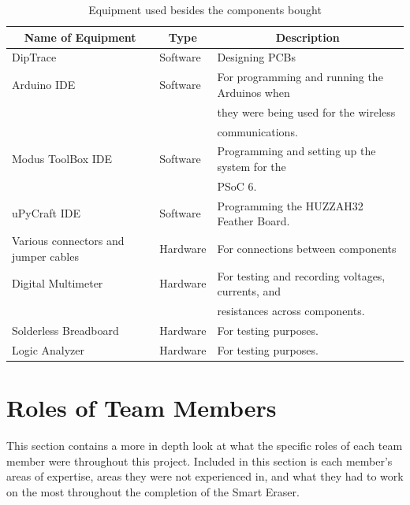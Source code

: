 \begin{table} [H]
	\normalsize
	\centering
	\begin{tabular}{|l|l|l|}
		\hline
		\multicolumn{1}{|c|}{\textbf{Name of Equipment}}  & 
		\multicolumn{1}{|c|}{\textbf{Type}}  & 
		\multicolumn{1}{|c|}{\textbf{Description}} \\
		\hline
				DipTrace 	&  Software		& Designing PCBs \\
		\hline
				Arduino IDE 	&  Software		& For programming and running the Arduinos when \\
								&  				& they were being used for the wireless \\
								&  				& communications. \\
		\hline
				Modus ToolBox IDE 	&  Software		& Programming and setting up the system for the \\
									&  				& PSoC 6. \\
		\hline
				uPyCraft IDE 	&  Software		& Programming the HUZZAH32 Feather Board. \\
		\hline
				Various connectors and jumper cables	&  Hardware		& For connections between components  \\
		\hline
				Digital Multimeter 	&  Hardware		& For testing and recording voltages, currents, and \\
									&  				& resistances across components. \\
		\hline
				Solderless Breadboard 	&  Hardware		& For testing purposes. \\
		\hline
				Logic Analyzer 	&  Hardware		& For testing purposes. \\

		\hline 
	\end{tabular} 
	\caption{Equipment used besides the components bought}
	\label{table:2}
\end{table}	

\section{Roles of Team Members}
This section contains a more in depth look at what the specific roles of each team member were throughout this project. Included in this section is each member’s areas of expertise, areas they were not experienced in, and what they had to work on the most throughout the completion of the Smart Eraser.
